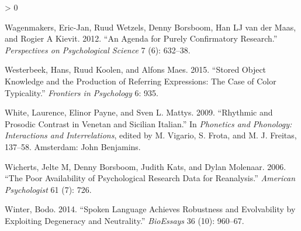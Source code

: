 \documentclass[
  12pt,
]{article}
\newlength{\cslhangindent}
\newenvironment{CSLReferences}[2] %
 {%
  \setlength{\parindent}{0pt}
  \ifodd #1 \everypar{\setlength{\hangindent}{\cslhangindent}}\ignorespaces\fi
  \ifnum #2 > 0
  \setlength{\parskip}{#2\baselineskip}
  \fi
 }%
 {}
\begin{document}
\begin{CSLReferences}{1}{0}
\leavevmode\hypertarget{ref-wagenmakers2012agenda}{}%
Wagenmakers, Eric-Jan, Ruud Wetzels, Denny Borsboom, Han LJ van der Maas, and Rogier A Kievit. 2012. {``An Agenda for Purely Confirmatory Research.''} \emph{Perspectives on Psychological Science} 7 (6): 632--38.

\leavevmode\hypertarget{ref-westerbeek2015stored}{}%
Westerbeek, Hans, Ruud Koolen, and Alfons Maes. 2015. {``Stored Object Knowledge and the Production of Referring Expressions: The Case of Color Typicality.''} \emph{Frontiers in Psychology} 6: 935.

\leavevmode\hypertarget{ref-white2009}{}%
White, Laurence, Elinor Payne, and Sven L. Mattys. 2009. {``Rhythmic and Prosodic Contrast in {V}enetan and {S}icilian {I}talian.''} In \emph{Phonetics and Phonology: Interactions and Interrelations}, edited by M. Vigario, S. Frota, and M. J. Freitas, 137--58. Amsterdam: John Benjamins.

\leavevmode\hypertarget{ref-wicherts2006poor}{}%
Wicherts, Jelte M, Denny Borsboom, Judith Kats, and Dylan Molenaar. 2006. {``The Poor Availability of Psychological Research Data for Reanalysis.''} \emph{American Psychologist} 61 (7): 726.

\leavevmode\hypertarget{ref-winter2014spoken}{}%
Winter, Bodo. 2014. {``Spoken Language Achieves Robustness and Evolvability by Exploiting Degeneracy and Neutrality.''} \emph{BioEssays} 36 (10): 960--67.

\end{CSLReferences}

\endgroup
\end{document}
